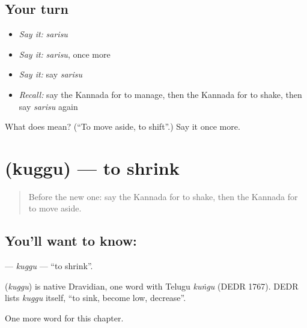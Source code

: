 \subsection*{Your turn}
\begin{itemize}
\raggedright
  \item \emph{Say it:} \emph{sarisu}
  \item \emph{Say it:} \emph{sarisu}, once more
  \item \emph{Say it:} say \emph{sarisu}
  \item \emph{Recall:} say the Kannada for to manage, then the Kannada for to shake, then say \emph{sarisu} again
\end{itemize}

\begin{tcolorbox}[breakable,colback=teal!4,colframe=teal!35!black,title={Before you move on}]
What does  mean? (\textquotedblleft{}To move aside, to shift\textquotedblright{}.) Say it once more.
\end{tcolorbox}
\section[\texorpdfstring{\kn{ಕುಗ್ಗು} (kuggu)}{ಕುಗ್ಗು (kuggu)}]{ (kuggu) — to shrink}

\label{lesson:KA-C244-kuggu}



\begin{quote}
Before the new one: say the Kannada for to shake, then the Kannada for to move aside.
\end{quote}

\subsection*{You'll want to know: }
\textbf{} — \emph{kuggu} — \textquotedblleft{}to shrink\textquotedblright{}.

\begin{cousinweb}
\textbf{} (\emph{kuggu}) is native Dravidian, one word with Telugu \emph{kuṅgu} (DEDR 1767). DEDR lists \emph{kuggu} itself, \textquotedblleft{}to sink, become low, decrease\textquotedblright{}.
\end{cousinweb}

\begin{grammarlens}[title={What you've built}]
One more word for this chapter.
\end{grammarlens}

